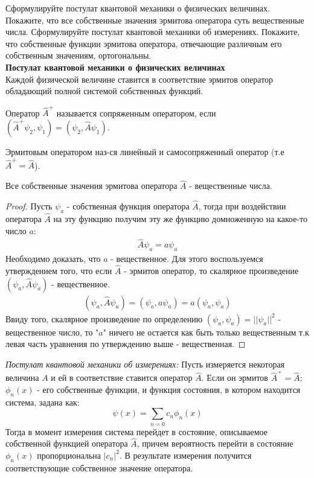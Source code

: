 \documentclass[__main__.tex]{subfiles}
\begin{document}
Сформулируйте постулат квантовой механики о физических величинах. Покажите, что все собственные значения эрмитова оператора суть вещественные числа. Сформулируйте постулат квантовой механики об измерениях. Покажите, что собственные функции эрмитова оператора, отвечающие различным его собственным значениям, ортогональны.\\ 

\textbf{Постулат квантовой механики о физических величинах}\\
Каждой физической величине ставится в соответствие эрмитов оператор обладающий полной системой собственных функций.
\begin{definition}
	Оператор $\hat{A}^+$ называется сопряженным оператором, если $(\hat{A}^+ \psi_2, \psi_1) = (\psi_2, \hat{A} \psi_1)$.
\end{definition}

\begin{definition}
	Эрмитовым оператором наз-ся линейный и самосопряженный оператор (т.е $\hat{A}^+ = \hat{A}$).
\end{definition}

\begin{statement}
	Все собственные значения эрмитова оператора $\hat{A}$ - вещественные числа.
\end{statement}
\begin{proof}
	Пусть $\psi_a$ - собственная функция оператора $\hat{A}$, тогда при воздействии оператора $\hat{A}$ на эту функцию получим эту же функцию домноженную на какое-то число $a$:
	\begin{gather*}
		\hat{A}\psi_a = a\psi_a
	\end{gather*}
	Необходимо доказать, что $a$ - вещественное. Для этого воспользуемся утверждением того, что если $\hat{A}$ - эрмитов оператор, то скалярное произведение $(\psi_a,\hat{A}\psi_a)$ - вещественное.
	\begin{gather*}
		(\psi_a,\hat{A}\psi_a) = (\psi_a,a\psi_a) = a(\psi_a,\psi_a)
	\end{gather*}
	Ввиду того, скалярное произведение по определению $(\psi_a,\psi_a) = \vert\vert\psi_a\vert\vert^2$ - вещественное число, то "$a$" ничего не остается как быть только вещественным т.к левая часть уравнения по утверждению выше  - вещественная.
\end{proof}

\textit{Постулат квантовой механики об измерениях:}
Пусть измеряется некоторая величина $A$ и ей в соответствие ставится оператор $\hat{A}$. Если он эрмитов ${\hat{A}^+=\hat{A}}$; $\phi_n(x)$ - его собственные функции, и функция состояния, в котором находится система, задана как:
$$\psi(x)=\sum_{n=0}c_n\phi_n(x)$$
Тогда в момент измерения система перейдет в состояние, описываемое собственной функцией оператора $\hat{A}$, причем вероятность перейти в состояние $\phi_n(x)$ пропорциональна ${\left|c_n\right|}^2$. В результате измерения получится соответствующие собственное значение оператора.
\end{document}

